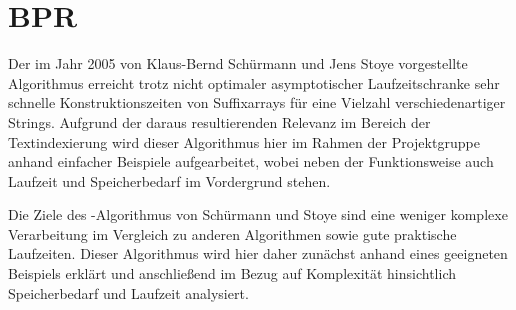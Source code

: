 \section{BPR}



Der  im Jahr 2005 von Klaus-Bernd Schürmann und Jens Stoye vorgestellte Algorithmus \bpr erreicht trotz nicht optimaler asymptotischer Laufzeitschranke sehr schnelle Konstruktionszeiten von Suffixarrays für eine Vielzahl verschiedenartiger Strings. Aufgrund der daraus resultierenden Relevanz im Bereich der Textindexierung wird dieser Algorithmus hier im Rahmen der Projektgruppe \sacabench anhand einfacher Beispiele aufgearbeitet, wobei neben der Funktionsweise auch Laufzeit und Speicherbedarf im Vordergrund stehen.\par
Die Ziele des \bpr-Algorithmus von Schürmann und Stoye \cite{schuermann2005} sind eine weniger komplexe Verarbeitung im Vergleich zu anderen Algorithmen sowie gute praktische Laufzeiten. Dieser Algorithmus wird hier daher zunächst anhand eines geeigneten Beispiels erklärt und anschließend im Bezug auf Komplexität hinsichtlich Speicherbedarf und Laufzeit analysiert.





